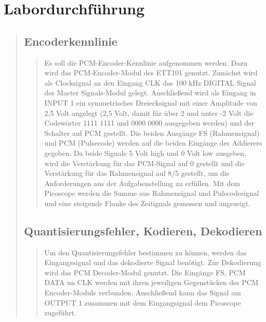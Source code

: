 \section{Labordurchführung}
\begin{quote}


	\subsection{Encoderkennlinie}
		\begin{quote}
		
			Es soll die PCM-Encoder-Kennlinie aufgenommen werden.
			Dazu wird das PCM-Encoder-Modul des ETT101 genutzt. Zunächst wird als Clocksignal an den Eingang CLK das 
			100 kHz DIGITAL Signal des Master Signals-Modul gelegt. Anschließend wird als Eingang in INPUT 1 ein 
			symmetrisches Dreiecksignal mit einer Amplitude von 2,5 Volt angelegt (2,5 Volt, damit für über 2 und unter -2 Volt
			die Codewörter 1111 1111 und 0000 0000 ausgegeben werden) und der Schalter auf PCM gestellt.
			Die beiden Ausgänge FS (Rahmensignal) und PCM (Pulsecode) werden auf die beiden Eingänge des Addierers gegeben. Da
			beide Signale 5 Volt high und 0 Volt low ausgeben, wird die Verstärkung für das PCM-Signal auf 0 gestellt und die
			Verstärkung für das Rahmensignal auf 8/5 gestellt, um die Anforderungen aus der Aufgabenstellung zu erfüllen.
			Mit dem Picoscope werden die Summe aus Rahmensignal und Pulscodesignal und eine steigende Flanke des Zeitignals
			gemessen und angezeigt.
			
			 
		\end{quote}
		
	\subsection{Quantisierungsfehler, Kodieren, Dekodieren}
	
		\begin{quote}
			
			Um den Quantisierungsfehler bestimmen zu können, werden das Eingangssignal und das dekodierte Signal benötigt. Zur
			Dekodierung wird das PCM Decoder-Modul genutzt. Die Eingänge FS, PCM DATA un CLK werden mit ihren jeweiligen
			Gegenstücken des PCM Encoder-Moduls verbunden. Anschließend kann das Signal am OUTPUT 1 zusammen mit dem
			Eingangsignal dem Picoscope zugeführt.\\
			  
			
			
		
		
		\end{quote}
	
	
	 

\end{quote}

